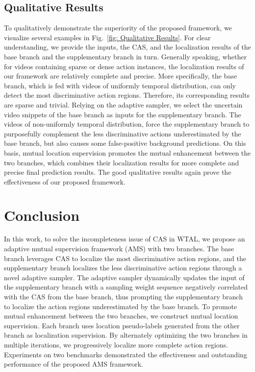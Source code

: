 \documentclass[journal]{IEEEtran}
\begin{document}
\subsection{Qualitative Results}
To qualitatively demonstrate the superiority of the proposed framework, we visualize several examples in Fig.~\ref{fig: Qualitative Results}. For clear understanding, we provide the inputs, the CAS, and the localization results of the base branch and the supplementary branch in turn. Generally speaking, whether for videos containing sparse or dense action instances, the localization results of our framework are relatively complete and precise. More specifically, the base branch, which is fed with videos of uniformly temporal distribution, can only detect the most discriminative action regions. Therefore, its corresponding results are sparse and trivial. Relying on the adaptive sampler, we select the uncertain video snippets of the base branch as inputs for the supplementary branch. The videos of non-uniformly temporal distribution, force the supplementary branch to purposefully complement the less discriminative actions underestimated by the base branch, but also causes some false-positive background predictions. On this basis, mutual location supervision promotes the mutual enhancement between the two branches, which combines their localization results for more complete and precise final prediction results. The good qualitative results again prove the effectiveness of our proposed framework.




\section{Conclusion}  \label{section:conclusion}
In this work, to solve the incompleteness issue of CAS in WTAL, we propose an adaptive mutual supervision framework (AMS) with two branches. The base branch leverages CAS to localize the most discriminative action regions, and the supplementary branch localizes the less discriminative action regions through a novel adaptive sampler. The adaptive sampler dynamically updates the input of the supplementary branch with a sampling weight sequence negatively correlated with the CAS from the base branch, thus prompting the supplementary branch to localize the action regions underestimated by the base branch. To promote mutual enhancement between the two branches, we construct mutual location supervision. Each branch uses location pseudo-labels generated from the other branch as localization supervision. By alternately optimizing the two branches in multiple iterations, we progressively localize more complete action regions. Experiments on two benchmarks demonstrated the effectiveness and outstanding performance of the proposed AMS framework.




\ifCLASSOPTIONcaptionsoff
  \newpage
\fi





\end{document}
